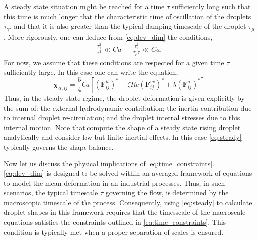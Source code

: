 A steady state situation might be reached for a time $\tau$ sufficiently long such that this time is much longer that the characteristic time of oscillation of the droplets $\tau_\gamma$, and that it is also greater than the typical damping timescale of the droplet $\tau_\mu$. 
More rigorously, one can deduce from \ref{eq:dev_dim} the conditions,
\begin{align}
    \frac{\tau_\gamma^2}{\tau^2}\ll Ca
    && \frac{\tau_\gamma^2}{\tau_\mu \tau}\ll Ca. 
    \label{eq:time_constraints}
\end{align}
For now, we assume that these conditions are respected for a given time $\tau$ sufficiently large.
In this case one can write the equation, 
\begin{equation}
    \bm\chi_{\alpha,ij}
    =\frac{5  }{4}  Ca [(\textbf{F}_{ij}^h)^*
    + \zeta Re (\textbf{F}_{ij}^{vv})^*
    + \lambda (\textbf{F}_{ij}^{\sigma})^*]
    \label{eq:steady}
\end{equation}
Thus, in the steady-state regime, the droplet deformation is given explicitly by the sum of: the external hydrodynamic contribution; the inertia contribution due to internal droplet re-circulation; and the droplet internal stresses due to this internal motion. 
Note that \citet{taylor1964deformation} compute the shape of a steady state rising droplet analytically and consider low but finite inertial effects. 
In this case \ref{eq:steady} typically governs the shape balance.
 
Now let us discuss the physical implications of \ref{eq:time_constraints}. 
\ref{eq:dev_dim} is designed to be solved within an averaged framework of equations to model the mean deformation in an industrial processes. 
Thus, in such scenarios, the typical timescale $\tau$ governing the flow, is determined by the macroscopic timescale of the process. 
Consequently, using \ref{eq:steady} to calculate droplet shapes in this framework requires that the timesscale of the macroscale equations satisfies the constraints outlined in \ref{eq:time_constraints}.
This condition is typically met when a proper separation of scales is ensured. 

